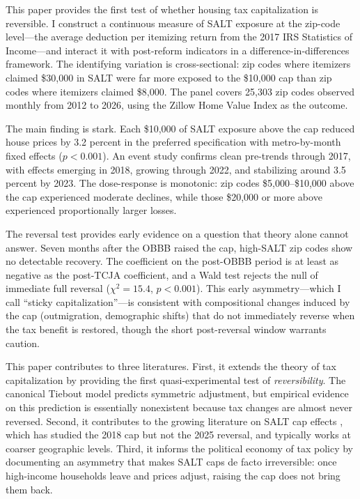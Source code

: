 \documentclass[12pt]{article}
\begin{document}
This paper provides the first test of whether housing tax capitalization is reversible. I construct a continuous measure of SALT exposure at the zip-code level---the average deduction per itemizing return from the 2017 IRS Statistics of Income---and interact it with post-reform indicators in a difference-in-differences framework. The identifying variation is cross-sectional: zip codes where itemizers claimed \$30,000 in SALT were far more exposed to the \$10,000 cap than zip codes where itemizers claimed \$8,000. The panel covers 25,303 zip codes observed monthly from 2012 to 2026, using the Zillow Home Value Index as the outcome.

The main finding is stark. Each \$10,000 of SALT exposure above the cap reduced house prices by 3.2 percent in the preferred specification with metro-by-month fixed effects ($p < 0.001$). An event study confirms clean pre-trends through 2017, with effects emerging in 2018, growing through 2022, and stabilizing around 3.5 percent by 2023. The dose-response is monotonic: zip codes \$5,000--\$10,000 above the cap experienced moderate declines, while those \$20,000 or more above experienced proportionally larger losses.

The reversal test provides early evidence on a question that theory alone cannot answer. Seven months after the OBBB raised the cap, high-SALT zip codes show no detectable recovery. The coefficient on the post-OBBB period is at least as negative as the post-TCJA coefficient, and a Wald test rejects the null of immediate full reversal ($\chi^2 = 15.4$, $p < 0.001$). This early asymmetry---which I call ``sticky capitalization''---is consistent with compositional changes induced by the cap (outmigration, demographic shifts) that do not immediately reverse when the tax benefit is restored, though the short post-reversal window warrants caution.

This paper contributes to three literatures. First, it extends the theory of tax capitalization \citep{oates1969effects,rosen1979tax,gyourko1991differential,hilber2016impact} by providing the first quasi-experimental test of \textit{reversibility}. The canonical Tiebout model predicts symmetric adjustment, but empirical evidence on this prediction is essentially nonexistent because tax changes are almost never reversed. Second, it contributes to the growing literature on SALT cap effects \citep{sommer2018implications,brinkman2021salt,agrawal2022tax,li2024salt}, which has studied the 2018 cap but not the 2025 reversal, and typically works at coarser geographic levels. Third, it informs the political economy of tax policy by documenting an asymmetry that makes SALT caps de facto irreversible: once high-income households leave and prices adjust, raising the cap does not bring them back.
\end{document}
